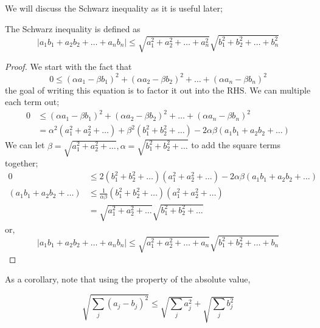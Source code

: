 We will discuss the Schwarz inequality as it is useful later;
\begin{definition}
    The Schwarz inequality is defined as
    \begin{equation}
        |a_1b_1 + a_2b_2 + \dots + a_nb_n| \leq \sqrt{a_1^2 + a_2^2 + \dots + a_n^2}  \sqrt{b_1^2 + b_2^2 + \dots + b_n^2}
    \end{equation}
\end{definition}
\begin{proof}
    We start with the fact that
    \begin{equation}
        0 \leq (\alpha a_1 - \beta b_1)^2 + (\alpha a_2 - \beta b_2)^2 + \dots + (\alpha a_n - \beta b_n)^2
    \end{equation}
    the goal of writing this equation is to factor it out into the RHS. We can multiple each term out;
    \begin{align*}
        0 &\leq (\alpha a_1 - \beta b_1)^2 + (\alpha a_2 - \beta b_2)^2 + \dots + (\alpha a_n - \beta b_n)^2\\
        &= \alpha^2(a_1^2 + a_2^2 + \dots) + \beta^2(b_1^2 + b_2^2 + \dots)- 2\alpha\beta(a_1b_1 + a_2b_2+\dots)
    \end{align*}
    We can let $\beta = \sqrt{a_1^2 + a_2^2 + \dots}, \alpha = \sqrt{b_1^2 + b_2^2 + \dots}$ to add the square terms together; 
    \begin{align*}
        0 &\leq 2 (b_1^2 + b_2^2 + \dots) (a_1^2 + a_2^2 + \dots) - 2\alpha\beta(a_1b_1 + a_2b_2+\dots)\\
        (a_1b_1 + a_2b_2+\dots)&\leq \frac{1}{\alpha\beta}(b_1^2 + b_2^2 + \dots) (a_1^2 + a_2^2 + \dots) \\
        &= \sqrt{a_1^2 + a_2^2  + \dots}\sqrt{b_1^2 + b_2^2 + \dots} 
    \end{align*}
    or,
    \begin{equation}
        |a_1b_1 + a_2b_2+\dots +a_nb_n|\leq \sqrt{a_1^2 + a_2^2  + \dots+a_n}\sqrt{b_1^2 + b_2^2 + \dots+b_n} 
    \end{equation}
\end{proof}
As a corollary, note that using the property of the absolute value, 
\begin{definition}
    \begin{equation}
       \sqrt{\sum_j (a_j - b_j)^2 } \leq  \sqrt{\sum_j a_j^2 } + \sqrt{\sum_j b_j^2 }
    \end{equation}
\end{definition}
